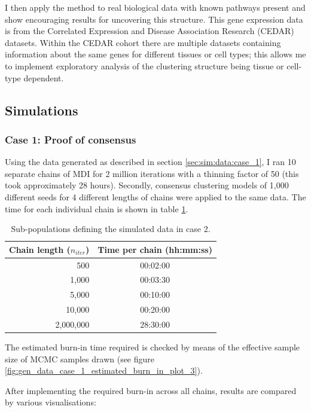 \documentclass[12pt]{article} %
\begin{document}
	I then apply the method to real biological data with known pathways present and show encouraging results for uncovering this structure. This gene expression data is from the Correlated Expression and Disease Association Research (CEDAR) datasets. Within the CEDAR cohort there are multiple datasets containing information about the same genes for different tissues or cell types; this allows me to implement exploratory analysis of the clustering structure being tissue or cell-type dependent.
	
	\subsection{Simulations}
	\subsubsection{Case 1: Proof of consensus} \label{sec:results:case_1}
	Using the data generated as described in section \ref{sec:sim:data:case_1}, I ran 10 separate chains of MDI for 2 million iterations with a thinning factor of 50 (this took approximately 28 hours). Secondly, consensus clustering models of 1,000 different seeds for 4 different lengths of chains were applied to the same data. The time for each individual chain is shown in table \ref{table:results:sim_1:timing}.
	
	\begin{table}[!htb] 
		\centering
		\begin{tabular}{r|c} 
			Chain length ($n_{iter}$)	& Time per chain (hh:mm:ss)\\ 
			\hline
			500							& 00:02:00 \\
			1,000						& 00:03:30 \\
			5,000						& 00:10:00 \\
			10,000						& 00:20:00 \\
			2,000,000					& 28:30:00
		\end{tabular}
		\caption{Sub-populations defining the simulated data in case 2.}
		\label{table:results:sim_1:timing}
	\end{table}

	The estimated burn-in time required is checked by means of the effective sample size of MCMC samples drawn (see figure \ref{fig:gen_data_case_1_estimated_burn_in_plot_3}).
	
	After implementing the required burn-in across all chains, results are compared by various visualisations:
	
\end{document}
